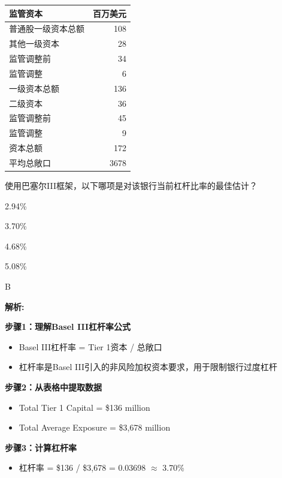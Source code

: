 \documentclass{article}
\newcounter{question} %
\newenvironment{explanation}
{\textbf{解析:}\par}
{\par}
\begin{document}
\begin{question}
    \begin{table}[htbp]
        \centering
        \begin{tabular}{|l|r|}
            \hline
            \textbf{监管资本} & \textbf{百万美元} \\
            \hline
            普通股一级资本总额 & 108 \\
            \hline
            其他一级资本 & 28 \\
            \quad 监管调整前 & 34 \\
            \quad 监管调整 & 6 \\
            \hline
            一级资本总额 & 136 \\
            \hline
            二级资本 & 36 \\
            \quad 监管调整前 & 45 \\
            \quad 监管调整 & 9 \\
            \hline
            资本总额 & 172 \\
            平均总敞口 & 3678 \\
            \hline
        \end{tabular}
    \end{table}
    使用巴塞尔III框架，以下哪项是对该银行当前杠杆比率的最佳估计？
\end{question}

\begin{choices}
    \item 2.94\%
    \item 3.70\%
    \item 4.68\%
    \item 5.08\%
\end{choices}

\begin{correctanswer}
    B
\end{correctanswer}

\begin{explanation}
  
    \textbf{步骤1：理解Basel III杠杆率公式}
    \begin{itemize}
        \item Basel III杠杆率 = Tier 1资本 / 总敞口
        \item 杠杆率是Basel III引入的非风险加权资本要求，用于限制银行过度杠杆
    \end{itemize}

    \textbf{步骤2：从表格中提取数据}
    \begin{itemize}
        \item Total Tier 1 Capital = \$136 million
        \item Total Average Exposure = \$3,678 million
    \end{itemize}

    \textbf{步骤3：计算杠杆率}
    \begin{itemize}
        \item 杠杆率 = \$136 / \$3,678 = 0.03698 $\approx$ 3.70\%
    \end{itemize}


\end{explanation}
\end{document}
